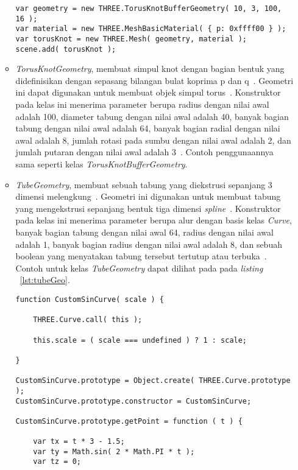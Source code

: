 \begin{itemize}
\begin{itemize}
\begin{lstlisting}[caption={Contoh penggunaan kelas {\it TorusKnotBufferGeometry}.}, label={lst:torusKnotBufferGeo},captionpos=b]
var geometry = new THREE.TorusKnotBufferGeometry( 10, 3, 100, 16 );
var material = new THREE.MeshBasicMaterial( { p: 0xffff00 } );
var torusKnot = new THREE.Mesh( geometry, material );
scene.add( torusKnot );
\end{lstlisting}
		\item {\it TorusKnotGeometry}, membuat simpul knot dengan bagian bentuk yang didefinisikan dengan sepasang bilangan bulat koprima p dan q~\cite{threejs}. Geometri ini dapat digunakan untuk membuat objek simpul torus~\cite{learningThreejs}. Konstruktor pada kelas ini menerima parameter berupa radius dengan nilai awal adalah 100, diameter tabung dengan nilai awal adalah 40, banyak bagian tabung dengan nilai awal adalah 64, banyak bagian radial dengan nilai awal adalah 8, jumlah rotasi pada sumbu dengan nilai awal adalah 2, dan jumlah putaran dengan nilai awal adalah 3~\cite{threejs}.  Contoh penggunaannya sama seperti kelas {\it TorusKnotBufferGeometry}.
		\item {\it TubeGeometry}, membuat sebuah tabung yang diekstrusi sepanjang 3 dimensi melengkung~\cite{threejs}. Geometri ini digunakan untuk membuat tabung yang mengekstrusi sepanjang bentuk tiga dimensi {\it spline}~\cite{learningThreejs}. Konstruktor pada kelas ini menerima parameter berupa alur dengan basis kelas {\it Curve}, banyak bagian tabung dengan nilai awal 64, radius dengan nilai awal adalah 1, banyak bagian radius dengan nilai awal adalah 8, dan sebuah boolean yang menyatakan tabung tersebut tertutup atau terbuka~\cite{threejs}. Contoh untuk kelas {\it TubeGeometry} dapat dilihat pada pada {\it listing} ~\ref{lst:tubeGeo}.
\begin{lstlisting}[caption={Contoh penggunaan kelas {\it TubeGeometry}.}, label={lst:tubeGeo},captionpos=b]
function CustomSinCurve( scale ) {

	THREE.Curve.call( this );

	this.scale = ( scale === undefined ) ? 1 : scale;

}

CustomSinCurve.prototype = Object.create( THREE.Curve.prototype );
CustomSinCurve.prototype.constructor = CustomSinCurve;

CustomSinCurve.prototype.getPoint = function ( t ) {

	var tx = t * 3 - 1.5;
	var ty = Math.sin( 2 * Math.PI * t );
	var tz = 0;


\end{lstlisting}
\end{itemize}
\end{itemize}
